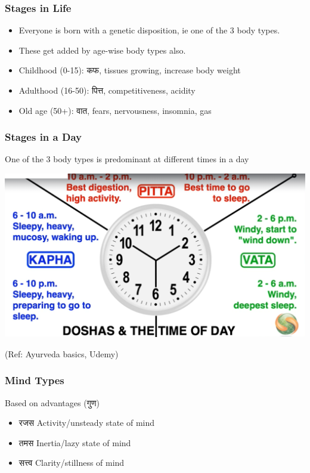 \begin{frame}[fragile]\frametitle{Stages in Life}

	\begin{itemize}
	\item  Everyone is born with a genetic disposition, ie one of the 3 body types.
	\item These get added by age-wise body types also.
	\item Childhood (0-15): कफ, tissues growing, increase body weight
	\item Adulthood (16-50): पित्त, competitiveness, acidity
	\item Old age (50+): वात, fears, nervousness, insomnia, gas
	\end{itemize}

\end{frame}

\begin{frame}[fragile]\frametitle{Stages in a Day}

One of the 3 body types is predominant at different times in a day

\begin{center}
\includegraphics[width=0.7\linewidth,keepaspectratio]{images/ayur3}
\end{center}

{\tiny (Ref: Ayurveda basics, Udemy)}

\end{frame}



\begin{frame}[fragile]\frametitle{Mind Types}
Based on advantages (गुण)

	\begin{itemize}
	\item  रजस Activity/unsteady state of mind
	\item तमस  Inertia/lazy state of mind
	\item सत्त्व Clarity/stillness of mind
	\end{itemize}

\end{frame}

